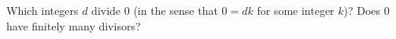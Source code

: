Which integers $d$ divide $0$ (in the sense that $0=dk$ for some integer $k$)? Does $0$ have finitely many divisors?
